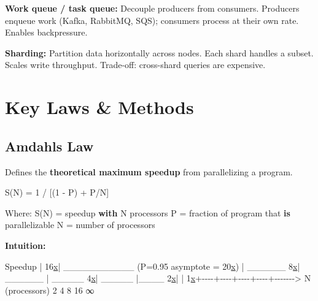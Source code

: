 \documentclass[11pt]{article}
\newenvironment{Shaded}{\begin{snugshade}}{\end{snugshade}}
\newcommand{\ControlFlowTok}[1]{\textcolor[rgb]{0.99,0.74,0.29}{\textbf{#1}}}
\newcommand{\DecValTok}[1]{\textcolor[rgb]{0.96,0.45,0.00}{#1}}
\newcommand{\ErrorTok}[1]{\textcolor[rgb]{0.85,0.27,0.33}{\underline{#1}}}
\newcommand{\FloatTok}[1]{\textcolor[rgb]{0.96,0.45,0.00}{#1}}
\newcommand{\KeywordTok}[1]{\textcolor[rgb]{0.81,0.81,0.76}{\textbf{#1}}}
\newcommand{\NormalTok}[1]{\textcolor[rgb]{0.81,0.81,0.76}{#1}}
\newcommand{\OperatorTok}[1]{\textcolor[rgb]{0.81,0.81,0.76}{#1}}
\begin{document}
\textbf{Work queue / task queue:} Decouple producers from consumers. Producers enqueue work (Kafka, RabbitMQ, SQS); consumers process at their own rate. Enables backpressure.

\textbf{Sharding:} Partition data horizontally across nodes. Each shard handles a subset. Scales write throughput. Trade-off: cross-shard queries are expensive.

\section{Key Laws \& Methods}\label{key-laws--methods}

\subsection{Amdahl\textquotesingle s Law}\label{amdahls-law}

Defines the \textbf{theoretical maximum speedup} from parallelizing a program.


\begin{Shaded}
\begin{Highlighting}[]
\NormalTok{S(N) }\OperatorTok{=} \DecValTok{1} \OperatorTok{/}\NormalTok{ [(}\DecValTok{1} \OperatorTok{{-}}\NormalTok{ P) }\OperatorTok{+}\NormalTok{ P}\OperatorTok{/}\NormalTok{N]}

\NormalTok{Where:}
\NormalTok{  S(N) }\OperatorTok{=}\NormalTok{ speedup }\ControlFlowTok{with}\NormalTok{ N processors}
\NormalTok{  P    }\OperatorTok{=}\NormalTok{ fraction of program that }\KeywordTok{is}\NormalTok{ parallelizable}
\NormalTok{  N    }\OperatorTok{=}\NormalTok{ number of processors}
\end{Highlighting}
\end{Shaded}

\textbf{Intuition:}


\begin{Shaded}
\begin{Highlighting}[]
\NormalTok{  Speedup}
    \OperatorTok{|}
 \DecValTok{16}\ErrorTok{x}\OperatorTok{|}\NormalTok{                          \_\_\_\_\_\_\_\_\_\_\_  (P}\OperatorTok{=}\FloatTok{0.95}\NormalTok{ asymptote }\OperatorTok{=} \DecValTok{20}\ErrorTok{x}\NormalTok{)}
    \OperatorTok{|}\NormalTok{                    \_\_\_\_\_\_}
  \DecValTok{8}\ErrorTok{x}\OperatorTok{|}\NormalTok{              \_\_\_\_\_\_}
    \OperatorTok{|}\NormalTok{         \_\_\_\_\_}
  \DecValTok{4}\ErrorTok{x}\OperatorTok{|}\NormalTok{    \_\_\_\_\_}
    \OperatorTok{|}\NormalTok{\_\_\_\_}
  \DecValTok{2}\ErrorTok{x}\OperatorTok{|}
    \OperatorTok{|}
  \DecValTok{1}\ErrorTok{x}\OperatorTok{+{-}{-}{-}{-}+{-}{-}{-}{-}+{-}{-}{-}{-}+{-}{-}{-}{-}+{-}{-}{-}{-}{-}{-}{-}\textgreater{}}\NormalTok{ N (processors)}
        \DecValTok{2}    \DecValTok{4}    \DecValTok{8}   \DecValTok{16}\NormalTok{   ∞}
\end{Highlighting}
\end{Shaded}
\end{document}
